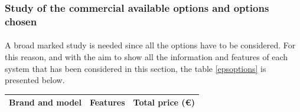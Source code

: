 \subsubsection{Study of the commercial available options and options chosen}
\paragraph{}A broad marked study is needed since all the options have to be considered. For this reason, and with the aim to show all the information and features of each system that has been considered in this section, the table \ref{epsoptions} is presented below.

\begin{longtable}{| l | c | c | }
\hline
\rowcolor[gray]{0.80}	\textbf{Brand and model} &  \textbf{Features}     & \textbf{Total price (\euro)}   \\
\hline
\endfirsthead


\end{longtable}
